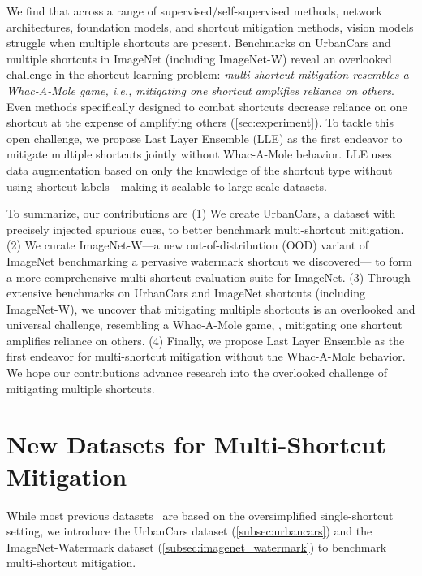 \documentclass[10pt,twocolumn,letterpaper]{article}
\begin{document}
We find that across a range of supervised/self-supervised methods, network architectures, foundation models, and shortcut mitigation methods, vision models
struggle when multiple shortcuts are present.
Benchmarks on UrbanCars and multiple shortcuts in ImageNet (including ImageNet-W) reveal
an overlooked challenge in the shortcut learning problem: \textit{multi-shortcut mitigation resembles a Whac-A-Mole game, i.e., mitigating one shortcut amplifies reliance on others}.
Even methods specifically designed to combat shortcuts decrease reliance on one shortcut at the expense of amplifying others (\cref{sec:experiment}).
To tackle this open challenge, we propose Last Layer Ensemble (LLE) as the first endeavor to mitigate multiple shortcuts jointly without Whac-A-Mole behavior.
LLE uses data augmentation based on only the knowledge of the shortcut type without using shortcut labels---making it scalable to large-scale datasets.

To summarize, our contributions are (1) We create UrbanCars, a dataset with precisely injected spurious cues, to better benchmark multi-shortcut mitigation.
(2) We curate ImageNet-W---a new out-of-distribution (OOD) variant of ImageNet benchmarking a pervasive watermark shortcut we discovered---
to form a more comprehensive multi-shortcut evaluation suite for ImageNet.
(3) Through extensive benchmarks on UrbanCars and ImageNet shortcuts (including ImageNet-W), we uncover that mitigating multiple shortcuts is an overlooked and universal challenge,
resembling a Whac-A-Mole game, \ie, mitigating one shortcut amplifies reliance on others.
(4) Finally, we propose Last Layer Ensemble as the first endeavor for multi-shortcut mitigation without the Whac-A-Mole behavior.
We hope our contributions advance research into the overlooked challenge of mitigating multiple shortcuts.

\section{New Datasets for Multi-Shortcut Mitigation}

While most previous datasets~\cite{sagawa2020Int.Conf.Learn.Represent.Distributionally,arjovsky2020Invariant,nam2020Adv.NeuralInf.Process.Syst.Learning,liu2015IEEEInt.Conf.Comput.Vis.ICCVDeep} are based on the oversimplified single-shortcut setting, we introduce the UrbanCars dataset (\cref{subsec:urbancars}) and the ImageNet-Watermark dataset (\cref{subsec:imagenet_watermark}) to benchmark multi-shortcut mitigation.
\end{document}
